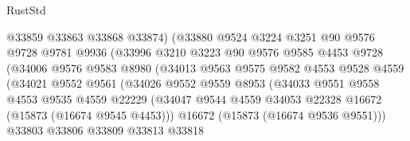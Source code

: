 \begin{lexlean}{RustStd}
\begin{coremodule}
                              @33859
                              @33863
                              @33868
                              @33874)
                            (@33880
                              @9524
                              @3224
                              @3251
                              @90
                              @9576
                              @9728
                              @9781
                              @9936
                              (@33996
                                @3210
                                @3223
                                @90
                                @9576
                                @9585
                                @4453
                                @9728
                                (@34006
                                  @9576
                                  @9583
                                  @8980
                                  (@34013
                                    @9563
                                    @9575
                                    @9582
                                    @4553
                                    @9528
                                    @4559
                                    (@34021
                                      @9552
                                      @9561
                                      (@34026
                                        @9552
                                        @9559
                                        @8953
                                        (@34033
                                          @9551
                                          @9558
                                          @4553
                                          @9535
                                          @4559
                                          @22229
                                          (@34047
                                            @9544
                                            @4559
                                            @34053
                                            @22328
                                            @16672
                                            (@15873 (@16674 @9545 @4453)))
                                          @16672
                                          (@15873 (@16674 @9536 @9551)))
                                        @33803
                                        @33806
                                        @33809
                                        @33813
                                        @33818

\end{coremodule}
\end{lexlean}
